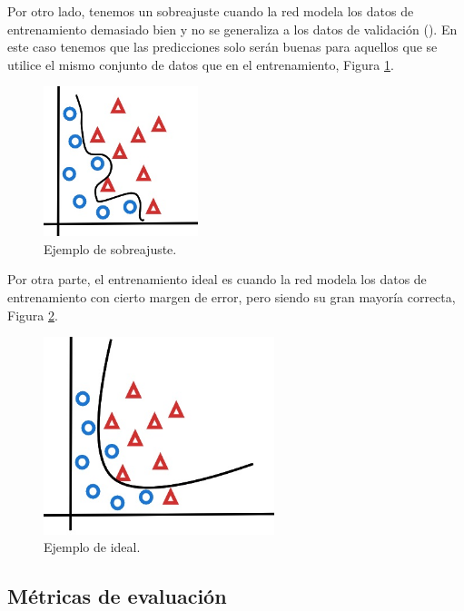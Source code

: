 Por otro lado, tenemos un sobreajuste cuando la red modela los datos de entrenamiento demasiado bien y no se generaliza a los datos de validación (\cite{rosebrock2017deep}). En este caso tenemos que las predicciones solo serán buenas para aquellos que se utilice el mismo conjunto de datos que en el entrenamiento, Figura \ref{fig:underFiting}.

\begin{figure}[H]
    \centering
    \includegraphics[width=0.4\textwidth]{MarcoTeorico/imgs/Ajuste_sobreajuste.jpg}
    \caption{Ejemplo de sobreajuste.}
    \label{fig:underFiting}
\end{figure}

Por otra parte, el entrenamiento ideal es cuando la red modela los datos de entrenamiento con cierto margen de error, pero siendo su gran mayoría correcta, Figura \ref{fig:idealFiting}.

\begin{figure}[H]
    \centering
    \includegraphics[width=0.6\textwidth]{MarcoTeorico/imgs/Ajuste_ideal.jpg}
    \caption{Ejemplo de ideal.}
    \label{fig:idealFiting}
\end{figure}

\subsection{Métricas de evaluación}


